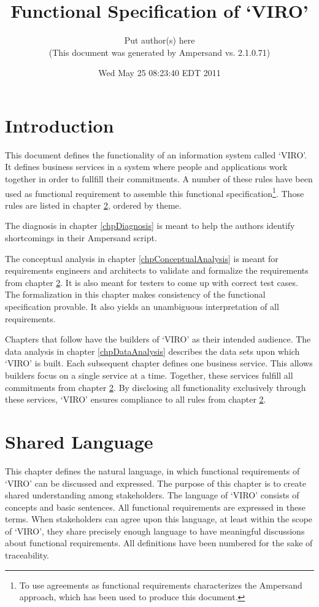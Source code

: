 \documentclass[10pt,a4paper]{report}              %
\title{Functional Specification of `VIRO'}
\author{Put author(s) here\\(This document was generated by Ampersand vs. 2.1.0.71)}
\date{Wed May 25 08:23:40 EDT 2011}
\theoremstyle{plain}\theorembodyfont{\rmfamily}\newtheorem{definition}{Definition}[section]
\theoremstyle{plain}\theorembodyfont{\rmfamily}\newtheorem{designrule}[definition]{Requirement}
\begin{document}
\maketitle

\tableofcontents

\chapter{Introduction}\label{chpIntro}

This document defines the functionality of an information system called `VIRO'. It defines business services in a system where people and applications work together in order to fullfill their commitments. A number of these rules have been used as functional requirement to assemble this functional specification\footnote{To use agreements as functional requirements characterizes the Ampersand approach, which has been used to produce this document. }. Those rules are listed in chapter \ref{chpFunctionalRequirements}, ordered by theme. 

The diagnosis in chapter \ref{chpDiagnosis} is meant to help the authors identify shortcomings in their Ampersand script.

The conceptual analysis in chapter \ref{chpConceptualAnalysis} is meant for requirements engineers and architects to validate and formalize the requirements from chapter \ref{chpFunctionalRequirements}. It is also meant for testers to come up with correct test cases. The formalization in this chapter makes consistency of the functional specification provable. It also yields an unambiguous interpretation of all requirements.

Chapters that follow have the builders of `VIRO' as their intended audience. The data analysis in chapter \ref{chpDataAnalysis} describes the data sets upon which `VIRO' is built. Each subsequent chapter defines one business service. This allows builders focus on a single service at a time. Together, these services fulfill all commitments from chapter \ref{chpFunctionalRequirements}. By disclosing all functionality exclusively through these services, `VIRO' ensures compliance to all rules from chapter \ref{chpFunctionalRequirements}. 

\chapter{Shared Language}\label{chpFunctionalRequirements}

This chapter defines the natural language, in which functional requirements of `VIRO' can be discussed and expressed. The purpose of this chapter is to create shared understanding among stakeholders. The language of `VIRO' consists of concepts and basic sentences. All functional requirements are expressed in these terms. When stakeholders can agree upon this language, at least within the scope of `VIRO', they share precisely enough language to have meaningful discussions about functional requirements. All definitions have been numbered for the sake of traceability. 
\end{document}
